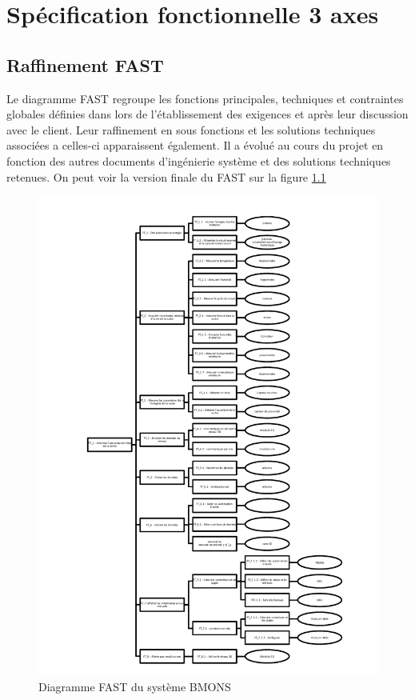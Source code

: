 \chapter{Spécification fonctionnelle  3 axes}

\section{Raffinement FAST}
Le diagramme FAST regroupe les fonctions principales, techniques et contraintes globales définies dans lors de 
l'établissement des exigences et après leur discussion avec le client. Leur raffinement en sous fonctions et les solutions techniques 
associées a celles-ci apparaissent également. Il a évolué au cours du projet en fonction des autres documents 
d'ingénierie système et des solutions techniques retenues. On peut voir la version finale du FAST sur la figure \ref{fig:fast}


\begin{figure}[h!]
\centering\includegraphics[scale=0.8]{FAST_BMONS.pdf}
\caption{\label{fig:fast} Diagramme FAST du système BMONS}
\end{figure}

